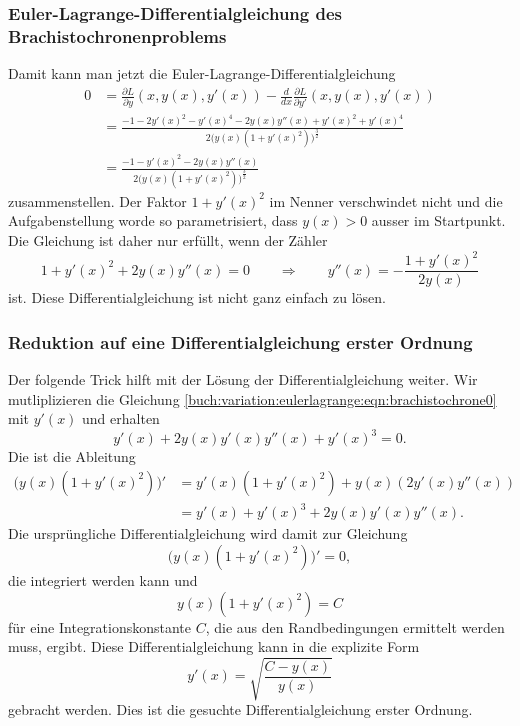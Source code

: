 \subsubsection{Euler-Lagrange-Differentialgleichung des
Brachistochronenproblems}
Damit kann man jetzt die Euler-Lagrange-Differentialgleichung
\begin{align*}
0
&=
\frac{\partial L}{\partial y}(x,y(x),y'(x))
-
\frac{d}{dx}
\frac{\partial L}{\partial y'}(x,y(x),y'(x))
\\
&=
\frac{
-1 - 2y'(x)^2 - y'(x)^4
-2y(x)y''(x)+y'(x)^2+y'(x)^4
}{
2
\bigl(
y(x)
(1+y'(x)^2)
\bigr)^{\frac32}
}
\\
&=
\frac{
-1 - y'(x)^2
-2y(x)y''(x)
}{
2
\bigl(
y(x)
(1+y'(x)^2)
\bigr)^{\frac32}
}
\end{align*}
zusammenstellen.
Der Faktor $1+y'(x)^2$ im Nenner verschwindet nicht und die
Aufgabenstellung worde so parametrisiert, dass $y(x)>0$ ausser
im Startpunkt.
Die Gleichung ist daher nur erfüllt, wenn der Zähler
\begin{equation}
1+y'(x)^2+2y(x)y''(x)=0
\qquad\Rightarrow\qquad
y''(x)
=
-\frac{1+y'(x)^2}{2y(x)}
\label{buch:variation:eulerlagrange:eqn:brachistochrone0}
\end{equation}
ist.
Diese Differentialgleichung ist nicht ganz einfach zu lösen.

%
%
\subsubsection{Reduktion auf eine Differentialgleichung erster Ordnung}
Der folgende Trick hilft mit der Lösung der Differentialgleichung weiter.
Wir mutliplizieren die Gleichung
\eqref{buch:variation:eulerlagrange:eqn:brachistochrone0}
mit $y'(x)$ und erhalten
\begin{equation}
y'(x) + 2y(x)y'(x)y''(x) + y'(x)^3 = 0.
\label{buch:variation:eulerlagrange:eqn:multiplikation}
\end{equation}
Die ist die Ableitung
\begin{align*}
\bigl(
y(x)(1+y'(x)^2)
\bigr)'
&=
y'(x)(1+y'(x)^2)
+
y(x)(2y'(x)y''(x))
\\
&=
y'(x) + y'(x)^3
+2y(x)y'(x)y''(x).
\end{align*}
Die ursprüngliche Differentialgleichung wird damit zur Gleichung
\[
\bigl(
y(x)(1+y'(x)^2)
\bigr)'
=
0,
\]
die integriert werden kann und
\[
y(x)(1+y'(x)^2)
=
C
\]
für eine Integrationskonstante $C$, die aus den Randbedingungen
ermittelt werden muss, ergibt.
Diese Differentialgleichung kann in die explizite Form
\begin{equation}
y'(x)
=
\sqrt{
\frac{C-y(x)}{y(x)}
}
\label{buch:variation:eulerlagrange:eqn:brachistochrone1}
\end{equation}
gebracht werden.
Dies ist die gesuchte Differentialgleichung erster Ordnung.

